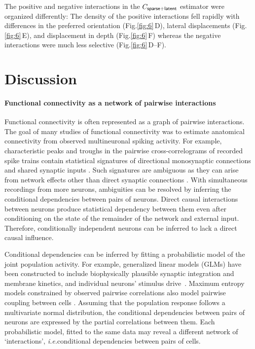 \documentclass[10pt]{article}
\newcommand{\sq}[1]{\lq#1\rq}
\newcommand{\figref}[2]{Fig.\;\ref{fig:#1}\,#2}
\newcommand{\ie}{\emph{i.e.}\;}
\begin{document}
The positive and negative interactions in the $C_{\sf sparse+latent}$ estimator were organized differently: The density of the positive interactions fell rapidly with differences in the preferred orientation (\figref{6}{D}), lateral displacements (\figref{6}{E}), and displacement in depth (\figref{6}{F}) whereas the negative interactions were much less selective (\figref{6}{D--F}).

\section*{Discussion}
\paragraph{Functional connectivity as a network of pairwise interactions}
Functional connectivity is often represented as a graph of pairwise interactions. The goal of many studies of functional connectivity was to estimate  anatomical connectivity from  observed multineuronal spiking activity.  For example, characteristic peaks and troughs in the pairwise cross-correlograms of recorded spike trains contain statistical signatures of directional monosynaptic connections and shared synaptic inputs \cite{Gerstein:1964, Perkel:1967, Moore:1970, Alonso:1998, Denman:2013}.  Such signatures are ambiguous as they can arise from network effects other than direct synaptic connections \cite{Aertsen:1989}.  With simultaneous recordings from more neurons, ambiguities can be resolved by inferring the conditional dependencies between pairs of neurons.  Direct causal interactions between neurons produce statistical dependency between them even after conditioning on the state of the remainder of the network and external input. Therefore, conditionally independent neurons can be inferred to lack a direct causal influence.  

Conditional dependencies can be inferred by fitting a probabilistic model of the joint population activity. For example, generalized linear models (GLMs) have been constructed to  include biophysically plausible synaptic integration and membrane kinetics, and individual neurons' stimulus drive~\cite{Pillow:2008}.  Maximum entropy models constrained by observed pairwise correlations also model pairwise coupling between cells \cite{Schneidman:2006, Tkacik:2006, Yu:2008, Tang:2008, Shlens:2009}.  Assuming that the population response follows a multivariate normal distribution, the conditional dependencies between pairs of neurons are expressed by the partial correlations between them.   Each probabilistic model, fitted to the same data may reveal a different network of \sq{interactions},  \ie conditional dependencies between pairs of cells. 
\end{document}
